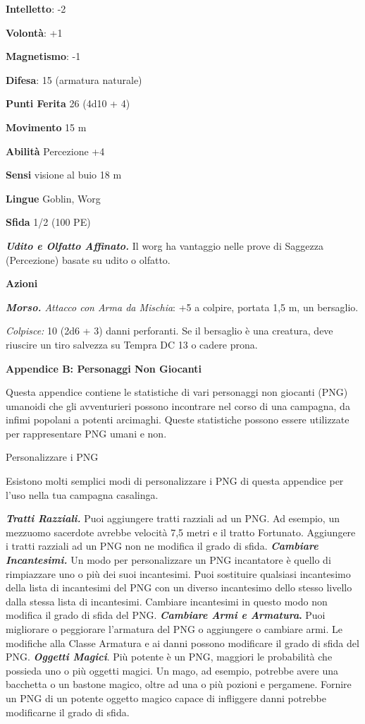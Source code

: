 \begin{multicols}{2}
\textbf{Intelletto}: -2

\textbf{Volontà}: +1

\textbf{Magnetismo}: -1

\textbf{Difesa}: 15 (armatura naturale)

\textbf{Punti Ferita} 26 (4d10 + 4)

\textbf{Movimento} 15 m

\textbf{Abilità} Percezione +4

\textbf{Sensi} visione al buio 18 m

\textbf{Lingue} Goblin, Worg

\textbf{Sfida} 1/2 (100 PE)

\emph{\textbf{Udito e Olfatto Affinato.}} Il worg ha vantaggio nelle
prove di Saggezza (Percezione) basate su udito o olfatto.

\textbf{Azioni}

\emph{\textbf{Morso.} Attacco con Arma da Mischia}: +5 a colpire,
portata 1,5 m, un bersaglio.

\emph{Colpisce:} 10 (2d6 + 3) danni perforanti. Se il bersaglio è una
creatura, deve riuscire un tiro salvezza su Tempra DC 13 o cadere prona.



\textbf{Appendice B: Personaggi Non Giocanti}

Questa appendice contiene le statistiche di vari personaggi non giocanti
(PNG) umanoidi che gli avventurieri possono incontrare nel corso di una
campagna, da infimi popolani a potenti arcimaghi. Queste statistiche
possono essere utilizzate per rappresentare PNG umani e non.

Personalizzare i PNG

Esistono molti semplici modi di personalizzare i PNG di questa appendice
per l'uso nella tua campagna casalinga.

\emph{\textbf{Tratti Razziali.}} Puoi aggiungere tratti razziali ad un
PNG. Ad esempio, un mezzuomo sacerdote avrebbe velocità 7,5 metri e il
tratto Fortunato. Aggiungere i tratti razziali ad un PNG non ne modifica
il grado di sfida. \emph{\textbf{Cambiare Incantesimi.}} Un modo per
personalizzare un PNG incantatore è quello di rimpiazzare uno o più dei
suoi incantesimi. Puoi sostituire qualsiasi incantesimo della lista di
incantesimi del PNG con un diverso incantesimo dello stesso livello
dalla stessa lista di incantesimi. Cambiare incantesimi in questo modo
non modifica il grado di sfida del PNG. \textbf{\emph{Cambiare Armi e
Armatura}.} Puoi migliorare o peggiorare l'armatura del PNG o aggiungere
o cambiare armi. Le modifiche alla Classe Armatura e ai danni possono
modificare il grado di sfida del PNG. \emph{\textbf{Oggetti Magici}}.
Più potente è un PNG, maggiori le probabilità che possieda uno o più
oggetti magici. Un mago, ad esempio, potrebbe avere una bacchetta o un
bastone magico, oltre ad una o più pozioni e pergamene. Fornire un PNG
di un potente oggetto magico capace di infliggere danni potrebbe
modificarne il grado di sfida.


\end{multicols}
